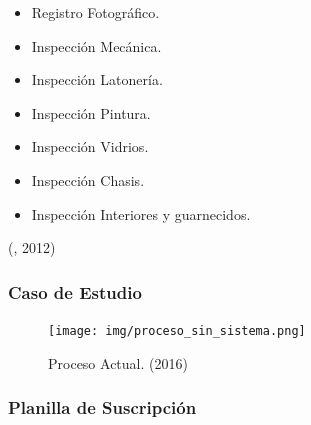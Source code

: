 \begin{itemize}

	\item Registro Fotográfico.

	\item Inspección Mecánica.

	\item Inspección Latonería.

	\item Inspección Pintura.

	\item Inspección Vidrios.

	\item Inspección Chasis.

	\item Inspección Interiores y guarnecidos.

\end{itemize}

(\citet{peritoIVbib}, 2012)

\subsubsection{Caso de Estudio}

\begin{figure}[H]
\begin{center}
	\texttt{[image: img/proceso\_sin\_sistema.png]}
\end{center}
\caption{Proceso Actual. (2016)}
\label{fig:proc_sin_sistema}
\end{figure}
\setlength{\parskip}{0mm}


\newpage

\subsubsection{Planilla de Suscripción}

